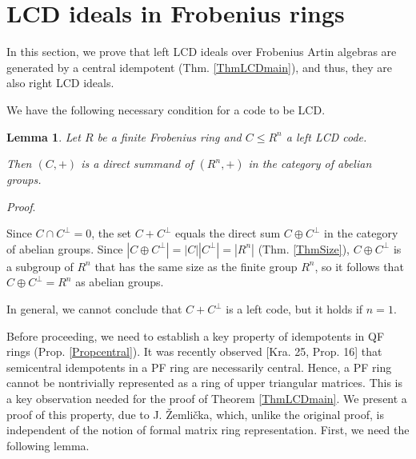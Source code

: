 \documentclass{article}
\theoremstyle{plain}
\newtheorem{Lemma}[veta]{Lemma}
\theoremstyle{plain}
\theoremstyle{remark}
\theoremstyle{plain}
\newenvironment{dukaz}{
  \par\medskip \noindent
  \textit{Proof}.
}{

\rightline{$\qedsymbol$}
}
\begin{document}
\section{LCD ideals in Frobenius rings}\label{SecFrob}

In this section, we prove that left LCD ideals over Frobenius Artin algebras are generated by a central idempotent (Thm. \ref{ThmLCDmain}), and thus, they are also right LCD ideals.

We have the following necessary condition for a code to be LCD.
\begin{Lemma}\label{LemmaAbel}
    Let $R$ be a finite Frobenius ring and $C\leq R^n$ a left LCD code.
    
    Then $(C, +)$ is a direct summand of $(R^n, +)$ in the category of abelian groups.       
\end{Lemma}
\begin{dukaz}
     Since $C\cap C^\perp=0$, the set $C+C^\perp$ equals the direct sum $C\oplus C^\perp$ in the category of abelian groups. Since $|C\oplus C^\perp|=|C||C^\perp|=|R^n|$ (Thm. \ref{ThmSize}), $C\oplus C^\perp$ is a subgroup of $R^n$ that has the same size as the finite group $R^n$, so it follows that $C\oplus C^\perp=R^n$ as abelian groups. 
\end{dukaz}
In general, we cannot conclude that $C+C^\perp$ is a left code, but it holds if $n=1$. 

Before proceeding, we need to establish a key property of idempotents in QF rings (Prop. \ref{Propcentral}).    It was recently observed [Kra. 25, Prop. 16] that semicentral idempotents in a PF ring are necessarily central. Hence, a PF ring cannot be nontrivially represented as a ring of upper triangular matrices.  This is a key observation needed for the proof of Theorem \ref{ThmLCDmain}. We present a proof of this property, due to J. Žemlička, which, unlike the original proof, is independent of the notion of formal matrix ring representation. First, we need the following lemma.
\end{document}
